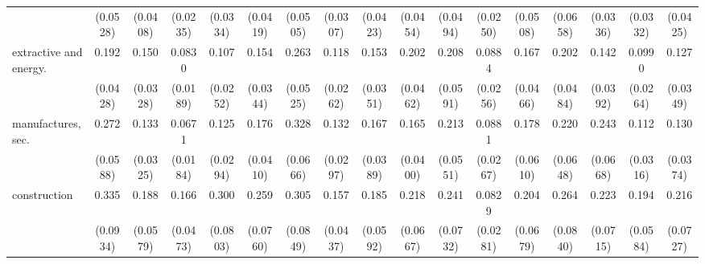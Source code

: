 {\begin{tabular}{l*{16}{c}}
                    &    (0.0528)         &    (0.0408)         &    (0.0235)         &    (0.0334)         &    (0.0419)         &    (0.0505)         &    (0.0307)         &    (0.0423)         &    (0.0454)         &    (0.0494)         &    (0.0250)         &    (0.0508)         &    (0.0658)         &    (0.0336)         &    (0.0332)         &    (0.0425)         \\
[1em]
extractive and energy.&       0.192\sym{***}&       0.150\sym{***}&      0.0830\sym{***}&       0.107\sym{***}&       0.154\sym{***}&       0.263\sym{***}&       0.118\sym{***}&       0.153\sym{***}&       0.202\sym{***}&       0.208\sym{***}&      0.0884\sym{***}&       0.167\sym{***}&       0.202\sym{***}&       0.142\sym{***}&      0.0990\sym{***}&       0.127\sym{***}\\
                    &    (0.0428)         &    (0.0328)         &    (0.0189)         &    (0.0252)         &    (0.0344)         &    (0.0525)         &    (0.0262)         &    (0.0351)         &    (0.0462)         &    (0.0591)         &    (0.0256)         &    (0.0466)         &    (0.0484)         &    (0.0392)         &    (0.0264)         &    (0.0349)         \\
[1em]
manufactures, sec.  &       0.272\sym{***}&       0.133\sym{***}&      0.0671\sym{***}&       0.125\sym{***}&       0.176\sym{***}&       0.328\sym{***}&       0.132\sym{***}&       0.167\sym{***}&       0.165\sym{***}&       0.213\sym{***}&      0.0881\sym{***}&       0.178\sym{***}&       0.220\sym{***}&       0.243\sym{***}&       0.112\sym{***}&       0.130\sym{***}\\
                    &    (0.0588)         &    (0.0325)         &    (0.0184)         &    (0.0294)         &    (0.0410)         &    (0.0666)         &    (0.0297)         &    (0.0389)         &    (0.0400)         &    (0.0551)         &    (0.0267)         &    (0.0610)         &    (0.0648)         &    (0.0668)         &    (0.0316)         &    (0.0374)         \\
[1em]
construction        &       0.335\sym{***}&       0.188\sym{***}&       0.166\sym{***}&       0.300\sym{***}&       0.259\sym{***}&       0.305\sym{***}&       0.157\sym{***}&       0.185\sym{***}&       0.218\sym{***}&       0.241\sym{***}&      0.0829\sym{***}&       0.204\sym{***}&       0.264\sym{***}&       0.223\sym{***}&       0.194\sym{***}&       0.216\sym{***}\\
                    &    (0.0934)         &    (0.0579)         &    (0.0473)         &    (0.0803)         &    (0.0760)         &    (0.0849)         &    (0.0437)         &    (0.0592)         &    (0.0667)         &    (0.0732)         &    (0.0281)         &    (0.0679)         &    (0.0840)         &    (0.0715)         &    (0.0584)         &    (0.0727)         \\

\end{tabular}}
